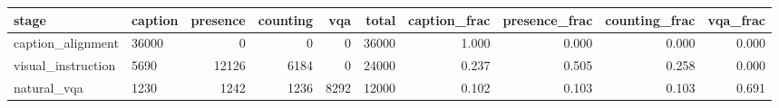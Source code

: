 \begin{tabular}{llrrrrrrrr}
\toprule
stage & caption & presence & counting & vqa & total & caption\_frac & presence\_frac & counting\_frac & vqa\_frac \\
\midrule
caption\_alignment & 36000 & 0 & 0 & 0 & 36000 & 1.000 & 0.000 & 0.000 & 0.000 \\
visual\_instruction & 5690 & 12126 & 6184 & 0 & 24000 & 0.237 & 0.505 & 0.258 & 0.000 \\
natural\_vqa & 1230 & 1242 & 1236 & 8292 & 12000 & 0.102 & 0.103 & 0.103 & 0.691 \\
\bottomrule
\end{tabular}
